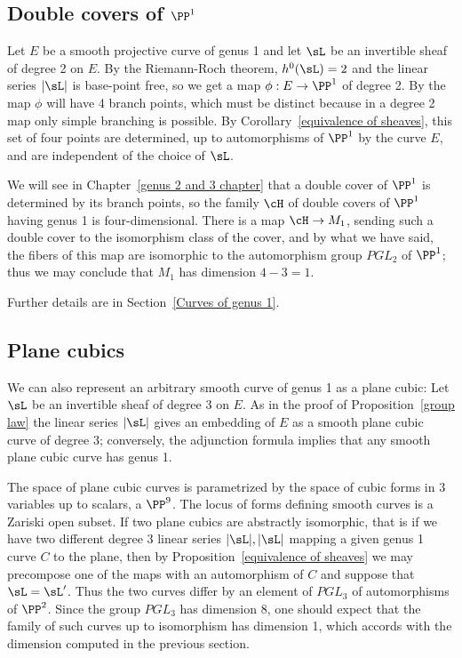 \subsection{Double covers of $\PP^1$}

Let $E$ be a smooth projective curve of genus 1 and let  $\sL$ be an invertible sheaf of degree 2 on $E$. By the Riemann-Roch theorem, $h^0(\sL) = 2$ and the linear series $|\sL|$ is base-point free, so we get a map $\phi : E \to \PP^1$ of degree 2. By \trh the map $\phi$ will have 4 branch points, which must be distinct because in a degree 2 map
only simple branching is possible. By Corollary~\ref{equivalence of sheaves}, this set of four points are determined, up to automorphisms of $\PP^1$ by the curve $E$, and are independent of the choice of $\sL$.

We will see in Chapter~\ref{genus 2 and 3 chapter} that a double cover of $\PP^1$ is determined by  its branch points, so the family $\cH$ of double covers of $\PP^1$ having genus 1 is four-dimensional. There is a map $\cH \to M_1$, sending such a double cover to the isomorphism class of the cover, and by what we have said, the fibers of this map are isomorphic to the automorphism group $PGL_2$ of $\PP^1$; thus we may conclude that $M_1$ has dimension $4-3=1$.

Further details are in Section~\ref{Curves of genus 1}.

\subsection{Plane cubics}

We can also represent an arbitrary smooth curve of genus 1 as a plane cubic:
Let $\sL$ be an invertible sheaf of degree 3 on $E$. As in the proof of Proposition~\ref{group law} the linear series $|\sL|$ gives an embedding of $E$ as a smooth plane cubic curve of degree 3; conversely, the adjunction formula implies that any smooth plane cubic curve has genus 1. 

The space of plane cubic curves is parametrized by the space of cubic forms in 3 variables up to 
scalars, a  $\PP^9$. The locus of forms defining smooth curves is a Zariski open subset. If two plane cubics are abstractly
isomorphic, that is if we have two different degree 3 linear series $|\sL|, |\sL|$ mapping a given genus 1 curve $C$ to the plane, then by
Proposition~\ref{equivalence of sheaves} we may  precompose one of the maps with an automorphism of $C$
and suppose that $\sL = \sL'$. Thus the two curves differ by an element of $PGL_3$ of automorphisms of $\PP^2$. Since the group $PGL_3$ has dimension 8, one should expect that the family of such curves up to isomorphism has dimension 1, which accords with the dimension computed in the previous section.



